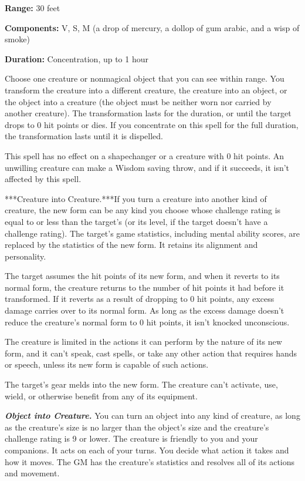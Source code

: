\documentclass[
]{article}
\begin{document}
\textbf{Range:} 30 feet

\textbf{Components:} V, S, M (a drop of mercury, a dollop of gum arabic,
and a wisp of smoke)

\textbf{Duration:} Concentration, up to 1 hour

Choose one creature or nonmagical object that you can see within range.
You transform the creature into a different creature, the creature into
an object, or the object into a creature (the object must be neither
worn nor carried by another creature). The transformation lasts for the
duration, or until the target drops to 0 hit points or dies. If you
concentrate on this spell for the full duration, the transformation
lasts until it is dispelled.

This spell has no effect on a shapechanger or a creature with 0 hit
points. An unwilling creature can make a Wisdom saving throw, and if it
succeeds, it isn't affected by this spell.

***Creature into Creature.***If you turn a creature into another kind of
creature, the new form can be any kind you choose whose challenge rating
is equal to or less than the target's (or its level, if the target
doesn't have a challenge rating). The target's game statistics,
including mental ability scores, are replaced by the statistics of the
new form. It retains its alignment and personality.

The target assumes the hit points of its new form, and when it reverts
to its normal form, the creature returns to the number of hit points it
had before it transformed. If it reverts as a result of dropping to 0
hit points, any excess damage carries over to its normal form. As long
as the excess damage doesn't reduce the creature's normal form to 0 hit
points, it isn't knocked unconscious.

The creature is limited in the actions it can perform by the nature of
its new form, and it can't speak, cast spells, or take any other action
that requires hands or speech, unless its new form is capable of such
actions.

The target's gear melds into the new form. The creature can't activate,
use, wield, or otherwise benefit from any of its equipment.

\emph{\textbf{Object into Creature.}} You can turn an object into any
kind of creature, as long as the creature's size is no larger than the
object's size and the creature's challenge rating is 9 or lower. The
creature is friendly to you and your companions. It acts on each of your
turns. You decide what action it takes and how it moves. The GM has the
creature's statistics and resolves all of its actions and movement.
\end{document}
